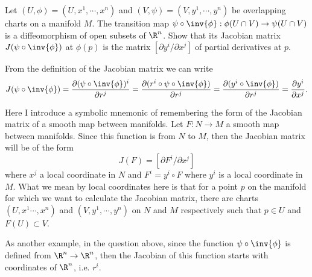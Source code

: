 \begin{problem}
	Let $ (U,\phi) = (U,x^1,\cdots,x^n) $ and $ (V,\psi) = (V,y^1,\cdots,y^n) $ be overlapping charts on a manifold $ M $. The transition map $ \psi \circ\inv{\phi}: \phi(U\cap V) \to \psi(U\cap V) $ is a diffeomorphism of open subsets of $ \R^n $. Show that its Jacobian matrix $ J(\psi\circ\inv{\phi}) $ at $ \phi(p) $ is the matrix $ [\partial y^i/\partial x^j] $ of partial derivatives at $ p $.
\end{problem}
\begin{solution}
	From the definition of the Jacobian matrix we can write
	\[ J(\psi \circ \inv{\phi}) = \frac{\partial (\psi \circ \inv{\phi})^i}{\partial r^j} =  \frac{\partial (r^i \circ \psi \circ \inv{\phi})}{\partial r^j} = \frac{\partial (y^i \circ \inv{\phi})}{\partial r^j} = \frac{\partial y^i}{\partial x^j}. \]
\end{solution}

\begin{observation}
	Here I introduce a symbolic mnemonic of remembering the form of the Jacobian matrix of a smooth map between manifolds. Let $ F:N\to M $ a smooth map between manifolds. Since this function is from $ N $ to $ M $, then the Jacobian matrix will be of the form
	\[ J(F) = [\partial F^i / \partial x^j] \] 
	where $ x^j $ a local coordinate in $ N $ and $ F^i = y^i \circ F $ where $ y^i $ is a local coordinate in $ M $. What we mean by local coordinates here is that for a point $ p $ on the manifold for which we want to calculate the Jacobian matrix, there are charts $ (U,x^1\cdots,x^n) $ and $ (V,y^1,\cdots,y^n) $ on $ N $ and $ M $ respectively such that $ p \in U $ and $ F(U) \subset V $.
	
	As another example, in the question above, since the function $ \psi\circ\inv{\phi} $ is defined from $ \R^n \to \R^n $, then the Jacobian of this function starts with coordinates of $ \R^n $, i.e. $ r^i $.
\end{observation}

